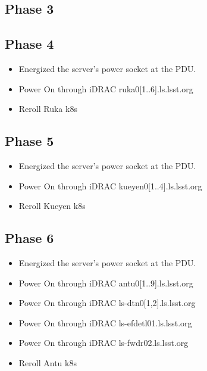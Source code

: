 \newpage
\subsection{Phase 3}

\subsection{Phase 4}
\begin{itemize}
  \item Energized the server's power socket at the PDU.
  \item Power On through iDRAC ruka0[1..6].ls.lsst.org
  \item Reroll Ruka k8s  
\end{itemize}

\newpage
\subsection{Phase 5}
\begin{itemize}
  \item Energized the server's power socket at the PDU.
  \item Power On through iDRAC kueyen0[1..4].ls.lsst.org
  \item Reroll Kueyen k8s  
\end{itemize}

\newpage
\subsection{Phase 6}
\begin{itemize}
  \item Energized the server's power socket at the PDU.
  \item Power On through iDRAC antu0[1..9].ls.lsst.org
  \item Power On through iDRAC ls-dtn0[1,2].ls.lsst.org
  \item Power On through iDRAC ls-efdetl01.ls.lsst.org
  \item Power On through iDRAC ls-fwdr02.ls.lsst.org
  \item Reroll Antu k8s
\end{itemize}
